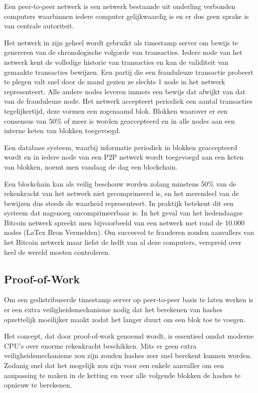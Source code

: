 	Een peer-to-peer netwerk is een netwerk bestaande uit onderling verbonden computers waarbinnen iedere computer gelijkwaardig is en er dus geen sprake is van centrale autoriteit. 
	
	Het netwerk in zijn geheel wordt gebruikt als timestamp server om bewijs te genereren van de chronologische volgorde van transacties. Iedere node van het netwerk kent de volledige historie van transacties en kan de validiteit van gemaakte transacties bewijzen. Een partij die een frauduleuze transactie probeert te plegen valt snel door de mand gezien ze slechts 1 node in het netwerk representeert. Alle andere nodes leveren immers een bewijs dat afwijkt van dat van de frauduleuze node. Het netwerk accepteert periodiek een aantal transacties tegelijkertijd, deze vormen een zogenaamd blok. Blokken waarover er een consensus van 50\% of meer is worden geaccepteerd en in alle nodes aan een interne keten van blokken toegevoegd.
	
	Een database systeem, waarbij informatie periodiek in blokken geaccepteerd wordt en in iedere node van een P2P netwerk wordt toegevoegd aan een keten van blokken, noemt men vandaag de dag een blockchain.
	
	Een blockchain kan als veilig beschouw worden zolang minstens 50\% van de rekenkracht van het netwerk niet gecomprimeerd is, en het merendeel van de bewijzen dus steeds de waarheid representeert. In praktijk betekent dit een systeem dat nagenoeg oncomprimeerbaar is. In het geval van het hedendaagse Bitcoin netwerk spreekt men bijvoorbeeld van een netwerk met rond de 10.000 nodes (LaTex Bron Vermelden). Om succesvol te frauderen zouden aanvallers van het Bitcoin netwerk maar liefst de helft van al deze computers, verspreid over heel de wereld moeten controleren. 
			
	\subsection{Proof-of-Work}
	\label{subsec:pow}
	Om een gedistribueerde timestamp server op peer-to-peer basis te laten werken is er een extra veiligheidsmechanisme nodig dat het berekenen van hashes opzettelijk moeilijker maakt zodat het langer duurt om een blok toe te voegen. 
	
	Het concept, dat door \textcite{Nakamoto2008} proof-of-work genoemd wordt, is essentieel omdat moderne CPU’s over enorme rekenkracht beschikken. Mits er geen extra veiligheidsmechanisme zou zijn zouden hashes zeer snel berekent kunnen worden. Zodanig snel dat het mogelijk zou zijn voor een enkele aanvaller om een aanpassing te maken in de ketting en voor alle volgende blokken de hashes te opnieuw te berekenen. 
	
